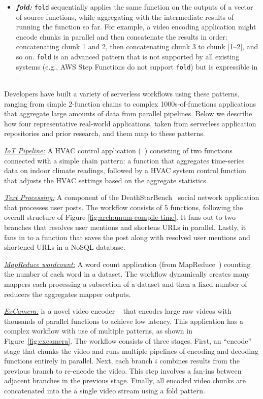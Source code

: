 \begin{itemize}
	\item \textit{\textbf{fold:}}
    \texttt{fold} sequentially applies the same function on the outputs of
    a vector of source functions, while aggregating with the intermediate
    results of running the function so far. For example, a video encoding
    application might encode chunks in parallel and then concatenate the
    results in order: concatenating chunk 1 and 2, then concatenating
    chunk 3 to chunk [1--2], and so on. \texttt{fold} is an advanced
    pattern that is not supported by all existing systems (e.g., AWS Step
    Functions do not support \texttt{fold}) but is expressible in \name{}.
\end{itemize}



Developers have built a variety of serverless workflows using these patterns,
ranging from simple 2-function chains to complex 1000s-of-functions
applications that aggregate large amounts of data from parallel pipelines.
Below we describe how four representative real-world applications, taken from
serverless application repositories and prior research, and them map to these
patterns.



\noindent\underline{\textit{IoT Pipeline:}} A HVAC control application
(~\cite{iot-pipeline}) consisting of two functions connected with a simple chain
pattern: a function that aggregates time-series data on indoor climate readings,
followed by a HVAC system control function that adjusts the HVAC settings based
on the aggregate statistics.

\noindent \underline{\textit{Text Processing:}} A component of the
DeathStarBench~\cite{deathstar} social network application that processes
user posts. The workflow consists of 5 functions, following the overall
structure of Figure \ref{fig:arch:unum-compile-time}. It fans out to two
branches that resolves user mentions and shortens URLs in parallel.
Lastly, it fans in to a function that saves the post along with resolved
user mentions and shortened URLs in a NoSQL database.

 \noindent \underline{\textit{MapReduce wordcount:}} A word count
application (from MapReduce~\cite{mapreduce}) counting the number of each
word in a dataset. The workflow dynamically creates many mappers each
processing a subsection of a dataset and then a fixed number of reducers
the aggregates mapper outputs.

\noindent\underline{\textit{ExCamera:}} is a novel video encoder
~\cite{excamera} that encodes large raw videos with thousands of parallel
functions to achieve low latency. This application has a complex workflow with
use of multiple patterns, as shown in Figure~\ref{fig:excamera}. The workflow
consists of three stages. First, an ``encode'' stage that chunks the video and
runs multiple pipelines of encoding and decoding functions entirely in
parallel. Next, each branch $i$ combines results from the previous branch to
re-encode the video. This step involves a fan-ins between adjacent branches in
the previous stage. Finally, all encoded video chunks are concatenated into
the a single video stream using a fold pattern.


